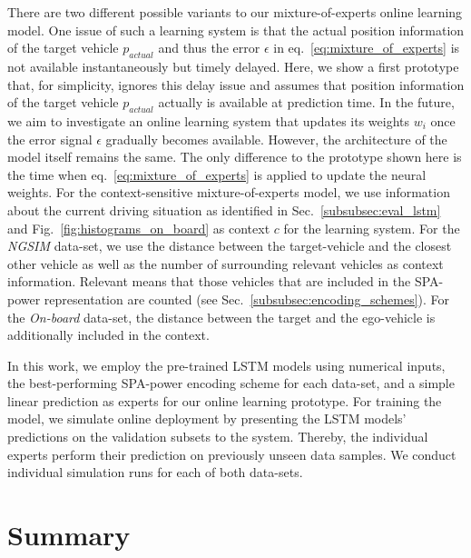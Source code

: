 There are two different possible variants to our mixture-of-experts online learning model.
One issue of such a learning system is that the actual position information of the target vehicle $p_{actual}$ and thus the error $\epsilon$ in eq.~\ref{eq:mixture_of_experts} is not available instantaneously but timely delayed.
Here, we show a first prototype that, for simplicity, ignores this delay issue and assumes that position information of the target vehicle $p_{actual}$ actually is available at prediction time.
In the future, we aim to investigate an online learning system that updates its weights $w_i$ once the error signal $\epsilon$ gradually becomes available.
However, the architecture of the model itself remains the same.
The only difference to the prototype shown here is the time when eq.~\ref{eq:mixture_of_experts} is applied to update the neural weights.
For the context-sensitive mixture-of-experts model, we use information about the current driving situation as identified in Sec.~\ref{subsubsec:eval_lstm} and Fig.~\ref{fig:histograms_on_board} as context $c$ for the learning system.
For the \emph{\ac{NGSIM}} data-set, we use the distance between the target-vehicle and the closest other vehicle as well as the number of surrounding relevant vehicles as context information.
Relevant means that those vehicles that are included in the \ac{SPA}-power representation are counted (see Sec.~\ref{subsubsec:encoding_schemes}).
For the \emph{On-board} data-set, the distance between the target and the ego-vehicle is additionally included in the context.

In this work, we employ the pre-trained \ac{LSTM} models using numerical inputs, the best-performing \ac{SPA}-power encoding scheme for each data-set, and a simple linear prediction as experts for our online learning prototype.
For training the model, we simulate online deployment by presenting the \ac{LSTM} models' predictions on the validation subsets to the system.
Thereby, the individual experts perform their prediction on previously unseen data samples.
We conduct individual simulation runs for each of both data-sets.

\section{Summary}
\label{sec:online_learn_summ}

